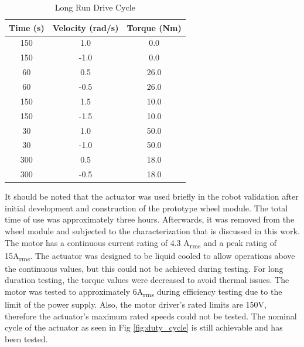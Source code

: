\begin{table}[h]
  \vskip0.2cm
  \caption{Long Run Drive Cycle}
  \label{table:long_run}
  \begin{center}
    \vskip-0.2cm
    \begin{tabular}{|c||c||c|}
    \hline
    Time (s) & Velocity (rad/s) & Torque (Nm)\\
    \hline
    150 & 1.0 & 0.0\\
    \hline
    150 & -1.0 & 0.0\\
    \hline
    60 & 0.5 & 26.0\\
    \hline
    60 & -0.5 & 26.0\\
    \hline
    150 & 1.5 & 10.0\\
    \hline
    150 & -1.5 & 10.0\\
    \hline
    30 & 1.0 & 50.0\\
    \hline
    30 & -1.0 & 50.0\\
    \hline
    300 & 0.5 & 18.0\\
    \hline
    300 & -0.5 & 18.0\\
    \hline
    \end{tabular}
  \end{center}
\end{table}

It should be noted that the actuator was used briefly in the robot validation after initial development and construction of the prototype wheel module.
The total time of use was approximately three hours.
Afterwards, it was removed from the wheel module and subjected to the characterization that is discussed in this work.
The motor has a continuous current rating of 4.3 A\textsubscript{rms} and a peak rating of 15A\textsubscript{rms}.
The actuator was designed to be liquid cooled to allow operations above the continuous values, but this could not be achieved during testing.
For long duration testing, the torque values were decreased to avoid thermal issues.
The motor was tested to approximately 6A\textsubscript{rms} during efficiency testing due to the limit of the power supply.
Also, the motor driver's rated limits are 150V, therefore the actuator's maximum rated speeds could not be tested.
The nominal cycle of the actuator as seen in Fig \ref{fig:duty_cycle} is still achievable and has been tested.



